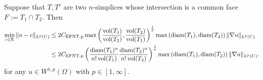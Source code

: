 \documentclass[a4paper]{amsart}
\begin{document}
\begin{lemma}\label{lemma:poincarefriedrichsoverfacepatch}
    Suppose that $T, T'$ are two $n$-simplices whose intersection is a common face $F := T_1 \cap T_2$. Then 
    \begin{align*}
        \min\limits_{ c \in {\mathbb R} }
        \| u - c \|_{L^{p}(U)}
        &
        \leq 
        2 C_{\rm{EFNT},p}
        \max\left( 
            \frac{ \operatorname{vol}(T_1) }{ \operatorname{vol}(T_2) }
            ,
            \frac{ \operatorname{vol}(T_2) }{ \operatorname{vol}(T_1) }
        \right)^{\frac 1 p}
        \max\left( {\operatorname{diam}}(T_1), {\operatorname{diam}}(T_2) \right)
        \| \nabla u \|_{L^{p}(U)}
        \\&
        \leq 
        2 C_{\rm{EFNT},p}
        \left( 
            \frac{{\operatorname{diam}}(T_1)^n}{n! \operatorname{vol}(T_1)} 
            \frac{{\operatorname{diam}}(T_2)^n}{n! \operatorname{vol}(T_2)} 
        \right)^{\frac 1 p}
        \max\left( {\operatorname{diam}}(T_1), {\operatorname{diam}}(T_2) \right)
        \| \nabla u \|_{L^{p}(U)}
        .
    \end{align*}
    for any $u \in W^{1,p}(\Omega)$ with $p \in [1,\infty]$.
\end{lemma}
\end{document}
